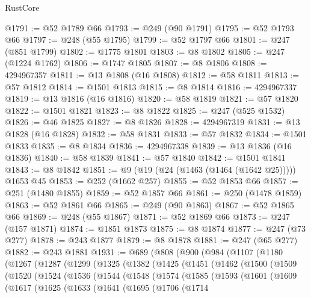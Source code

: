 \begin{lexlean}{RustCore}
\begin{coremodule}
@1791 := @52 @1789 @66
@1793 := @249 (@90 @1791)
@1795 := @52 @1793 @66
@1797 := @248 (@55 @1795)
@1799 := @52 @1797 @66
@1801 := @247 (@851 @1799)
@1802 := @1775 @1801
@1803 := @8 @1802
@1805 := @247 (@1224 @1762)
@1806 := @1747 @1805
@1807 := @8 @1806
@1808 := 4294967357
@1811 := @13 @1808 (@16 @1808)
@1812 := @58 @1811
@1813 := @57 @1812
@1814 := @1501 @1813
@1815 := @8 @1814
@1816 := 4294967337
@1819 := @13 @1816 (@16 @1816)
@1820 := @58 @1819
@1821 := @57 @1820
@1822 := @1501 @1821
@1823 := @8 @1822
@1825 := @247 (@525 @1532)
@1826 := @46 @1825
@1827 := @8 @1826
@1828 := 4294967319
@1831 := @13 @1828 (@16 @1828)
@1832 := @58 @1831
@1833 := @57 @1832
@1834 := @1501 @1833
@1835 := @8 @1834
@1836 := 4294967338
@1839 := @13 @1836 (@16 @1836)
@1840 := @58 @1839
@1841 := @57 @1840
@1842 := @1501 @1841
@1843 := @8 @1842
@1851 := @9 (@19 (@24 (@1463 (@1464 (@1642 @25))))) @1653 @45
@1853 := @252 (@1662 @257)
@1855 := @52 @1853 @66
@1857 := @251 (@1480 @1855)
@1859 := @52 @1857 @66
@1861 := @250 (@1478 @1859)
@1863 := @52 @1861 @66
@1865 := @249 (@90 @1863)
@1867 := @52 @1865 @66
@1869 := @248 (@55 @1867)
@1871 := @52 @1869 @66
@1873 := @247 (@157 @1871)
@1874 := @1851 @1873
@1875 := @8 @1874
@1877 := @247 (@73 @277)
@1878 := @243 @1877
@1879 := @8 @1878
@1881 := @247 (@65 @277)
@1882 := @243 @1881
@1931 := @689
    (@808
      (@900
        (@984
          (@1107
            (@1180
              (@1267
                (@1287
                  (@1299
                    (@1325
                      (@1382
                        (@1425
                          (@1451
                            (@1462
                              (@1500
                                (@1509
                                  (@1520
                                    (@1524
                                      (@1536
                                        (@1544
                                          (@1548
                                            (@1574
                                              (@1585
                                                (@1593
                                                  (@1601
                                                    (@1609
                                                      (@1617
                                                        (@1625
                                                          (@1633
                                                            (@1641
                                                              (@1695
                                                                (@1706
                                                                  (@1714

\end{coremodule}
\end{lexlean}
